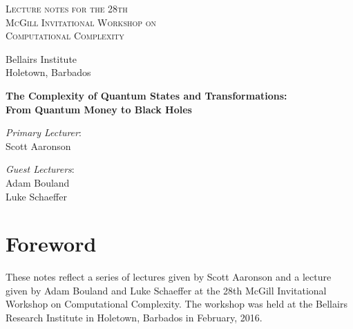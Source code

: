 \documentclass[12pt]{report}
\theoremstyle{plain}
\theoremstyle{definition}
\begin{document}
\begin{titlepage}
\begin{center}
\begin{huge}
\textsc{Lecture notes for the 28th\\ McGill Invitational Workshop on\\
Computational Complexity\\}
\end{huge}
\vspace{1.5cm}

\begin{Large}
Bellairs Institute\\
Holetown, Barbados

\vspace{2.5cm}
{\bf The Complexity of Quantum States and Transformations: \\ From Quantum Money to Black Holes}

\vspace{2cm}
\emph{Primary Lecturer}:\\
Scott Aaronson

\vspace{1cm}
\emph{Guest Lecturers}:\\
Adam Bouland\\
Luke Schaeffer
\end{Large}
\end{center}
\end{titlepage}

\newpage

\tableofcontents

\newpage

\chapter*{Foreword}
These notes reflect a series of lectures given by Scott Aaronson and
a lecture given by Adam Bouland and Luke Schaeffer at the 28th McGill Invitational Workshop on
Computational Complexity. The workshop was held at the Bellairs
Research Institute in Holetown, Barbados in February, 2016.

\newpage
\end{document}
